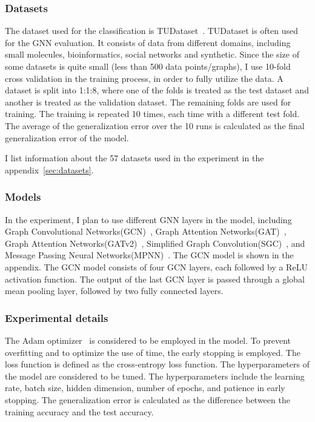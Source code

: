 \documentclass{article}
\begin{document}
\subsubsection{Datasets}
The dataset used for the classification is TUDataset~\cite{morris2020tudataset}. TUDataset is often used for the GNN evaluation. It consists of data from different domains, including small molecules, bioinformatics, social networks and synthetic. Since the size of some datasets is quite small (less than 500 data points/graphs), I use 10-fold cross validation in the training process, in order to fully utilize the data. A dataset is split into 1:1:8, where one of the folds is treated as the test dataset and another is treated as the validation dataset. The remaining folds are used for training. The training is repeated 10 times, each time with a different test fold. The average of the generalization error over the 10 runs is calculated as the final generalization error of the model.

I list information about the 57 datasets used in the experiment in the appendix~\ref{sec:datasets}.

\subsubsection{Models}
In the experiment, I plan to use different GNN layers in the model, including Graph Convolutional Networks(GCN)~\cite{kipf2016semi}, Graph Attention Networks(GAT)~\cite{velickovic2020pointer}, Graph Attention Networks(GATv2)~\cite{brody2021attentive}, Simplified Graph Convolution(SGC)~\cite{wu2019simplifying}, and Message Passing Neural Networks(MPNN)~\cite{gilmer2017neural}. The GCN model is shown in the appendix. The GCN model consists of four GCN layers, each followed by a ReLU activation function. The output of the last GCN layer is passed through a global mean pooling layer, followed by two fully connected layers.

\subsubsection{Experimental details}
The Adam optimizer~\cite{kingma2014adam} is considered to be employed in the model. To prevent overfitting and to optimize the use of time, the early stopping is employed. The loss function is defined as the cross-entropy loss function. The hyperparameters of the model are considered to be tuned. The hyperparameters include the learning rate, batch size, hidden dimension, number of epochs, and patience in early stopping. The generalization error is calculated as the difference between the training accuracy and the test accuracy.
\end{document}

